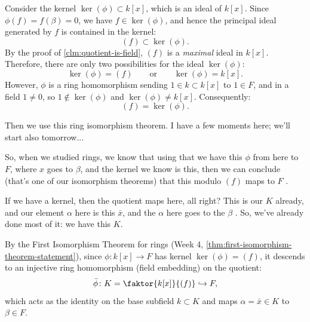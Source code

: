 \begin{proofWrapper}
\begin{content}
Consider the kernel $\ker(\phi) \subset k[x]$, which is an ideal of $k[x]$. Since $\phi(f) = f(\beta) = 0$, we have $f \in \ker(\phi)$, and hence the principal ideal generated by $f$ is contained in the kernel:
\[
(f) \subset \ker(\phi).
\]
By the proof of \cref{clm:quotient-is-field}, $(f)$ is a \emph{maximal} ideal in $k[x]$. Therefore, there are only two possibilities for the ideal $\ker(\phi)$:
\[
\ker(\phi) = (f) \qquad \text{or} \qquad \ker(\phi) = k[x].
\]
However, $\phi$ is a ring homomorphism sending $1 \in k \subset k[x]$ to $1 \in F$, and in a field $1 \neq 0$, so $1 \notin \ker(\phi)$ and $\ker(\phi) \neq k[x]$. Consequently:
\[
\boxed{(f) = \ker(\phi)}.
\]
\end{content}

\begin{speech}[01:29:23 - 01:30:44]
Then we use this ring isomorphism theorem. I have a few moments here; we'll start also tomorrow... 

So, when we studied rings, we know that using that we have this $\phi$ from here to $F$, where $x$ goes to $\beta$, and the kernel we know is this, then we can conclude (that's one of our isomorphism theorems) that this modulo $(f)$ maps to $F$ .

If we have a kernel, then the quotient maps here, all right? This is our $K$ already, and our element $\alpha$ here is this $\bar{x}$, and the $\alpha$ here goes to the $\beta$ . So, we've already done most of it: we have this $K$.
\end{speech}

\begin{content}
By the First Isomorphism Theorem for rings (Week 4, \cref{thm:first-isomorphism-theorem-statement}), since $\phi \colon k[x] \to F$ has kernel $\ker(\phi) = (f)$, it descends to an injective ring homomorphism (field embedding) on the quotient:
\[
\bar{\phi} \colon K = \faktor{k[x]}{(f)} \hookrightarrow F,
\]
which acts as the identity on the base subfield $k \subset K$ and maps $\alpha = \bar{x} \in K$ to $\beta \in F$.


\end{content}
\end{proofWrapper}
